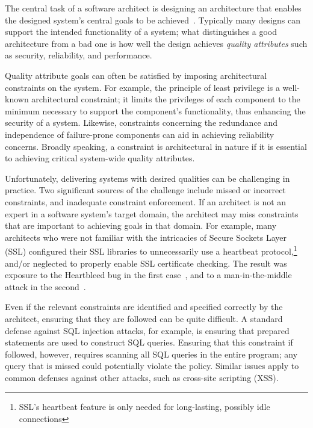 \documentclass[runningheads]{llncs}
\begin{document}
\begin{sloppypar}
The central task of a software architect is designing an architecture that enables the designed system's central goals to be achieved~\cite{bass-software-architecture-in-practice}.  Typically many designs can support the intended functionality of a system; what distinguishes a good architecture from a bad one is how well the design achieves \emph{quality attributes} such as security, reliability, and performance.

Quality attribute goals can often be satisfied by imposing architectural constraints on the system.  For example, the principle of least privilege is a well-known architectural constraint; it limits the privileges of each component to the minimum necessary to support the component's functionality, thus enhancing the security of a system.  Likewise, constraints concerning the redundance and independence of failure-prone components can aid in achieving reliability concerns.  Broadly speaking, a constraint is architectural in nature if it is essential to achieving critical system-wide quality attributes.

Unfortunately, delivering systems with desired qualities can be challenging in practice.  Two significant sources of the challenge include missed or incorrect constraints, and inadequate constraint enforcement.  If an architect is not an expert in a software system's target domain, the architect may miss constraints that are important to achieving goals in that domain.  For example, many architects who were not familiar with the intricacies of Secure Sockets Layer (SSL) configured their SSL libraries to unnecessarily use a heartbeat protocol,\footnote{SSL's heartbeat feature is only needed for long-lasting, possibly idle connections} and/or neglected to properly enable SSL certificate checking.  The result was exposure to the Heartbleed bug in the first case~\cite{Heartbleed}, and to a man-in-the-middle attack in the second~\cite{most-dangerous-code-in-the-world}.

Even if the relevant constraints are identified and specified correctly by the architect, ensuring that they are followed can be quite difficult.  A standard defense against SQL injection attacks, for example, is ensuring that prepared statements are used to construct SQL queries.  Ensuring that this constraint if followed, however, requires scanning all SQL queries in the entire program; any query that is missed could potentially violate the policy.  Similar issues apply to common defenses against other attacks, such as cross-site scripting (XSS).



\end{sloppypar}
\end{document}
